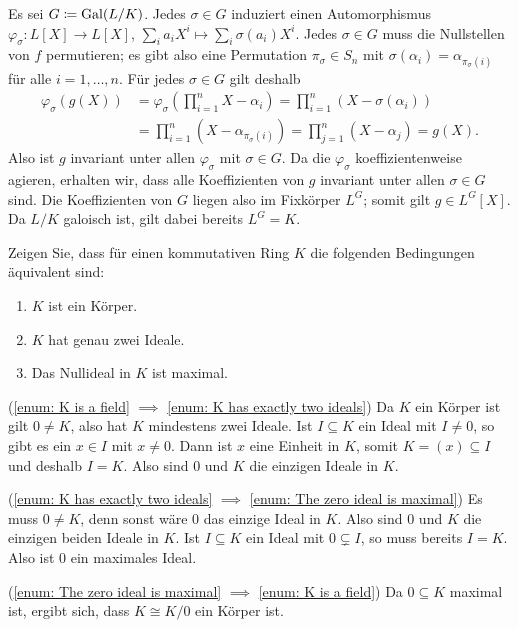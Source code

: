 \begin{solution}
  Es sei $G \coloneqq \operatorname{Gal}(L/K)$.
  Jedes $\sigma \in G$ induziert einen Automorphismus $\varphi_\sigma \colon L[X] \to L[X]$, $\sum_i a_i X^i \mapsto \sum_i \sigma(a_i) X^i$.
  Jedes $\sigma \in G$ muss die Nullstellen von $f$ permutieren;
  es gibt also eine Permutation $\pi_\sigma \in S_n$ mit $\sigma(\alpha_i) = \alpha_{\pi_\sigma(i)}$ für alle $i = 1, \dotsc, n$.
  Für jedes $\sigma \in G$ gilt deshalb
  \begin{align*}
        \varphi_\sigma( g(X) )
    &=  \varphi_\sigma\left( \prod_{i=1}^n X - \alpha_i \right)
     =  \prod_{i=1}^n ( X - \sigma(\alpha_i) )
    \\
    &=  \prod_{i=1}^n ( X- \alpha_{\pi_\sigma(i)} )
     =  \prod_{j=1}^n ( X - \alpha_j )
     =  g(X).
  \end{align*}
  Also ist $g$ invariant unter allen $\varphi_\sigma$ mit $\sigma \in G$.
  Da die $\varphi_\sigma$ koeffizientenweise agieren, erhalten wir, dass alle Koeffizienten von $g$ invariant unter allen $\sigma \in G$ sind.
  Die Koeffizienten von $G$ liegen also im Fixkörper $L^G$;
  somit gilt $g \in L^G[X]$.
  Da $L/K$ galoisch ist, gilt dabei bereits $L^G = K$.
\end{solution}


\begin{question}
  \label{question: characterization of fields via its ideals}
  Zeigen Sie, dass für einen kommutativen Ring $K$ die folgenden Bedingungen äquivalent sind:
  \begin{enumerate}
    \item
      \label{enum: K is a field}
      $K$ ist ein Körper.
    \item
      \label{enum: K has exactly two ideals}
      $K$ hat genau zwei Ideale.
    \item
      \label{enum: The zero ideal is maximal}
      Das Nullideal in $K$ ist maximal.
  \end{enumerate}
\end{question}


\begin{solution}
  (\ref{enum: K is a field} $\implies$ \ref{enum: K has exactly two ideals})
  Da $K$ ein Körper ist gilt $0 \neq K$, also hat $K$ mindestens zwei Ideale.
  Ist $I \subseteq K$ ein Ideal mit $I \neq 0$, so gibt es ein $x \in I$ mit $x \neq 0$.
  Dann ist $x$ eine Einheit in $K$, somit $K = (x) \subseteq I$ und deshalb $I = K$.
  Also sind $0$ und $K$ die einzigen Ideale in $K$.
  
  (\ref{enum: K has exactly two ideals} $\implies$ \ref{enum: The zero ideal is maximal})
  Es muss $0 \neq K$, denn sonst wäre $0$ das einzige Ideal in $K$.
  Also sind $0$ und $K$ die einzigen beiden Ideale in $K$.
  Ist $I \subseteq K$ ein Ideal mit $0 \subsetneq I$, so muss bereits $I = K$.
  Also ist $0$ ein maximales Ideal.
  
  (\ref{enum: The zero ideal is maximal} $\implies$ \ref{enum: K is a field})
  Da $0 \subseteq K$ maximal ist, ergibt sich, dass $K \cong K/0$ ein Körper ist.
\end{solution}


